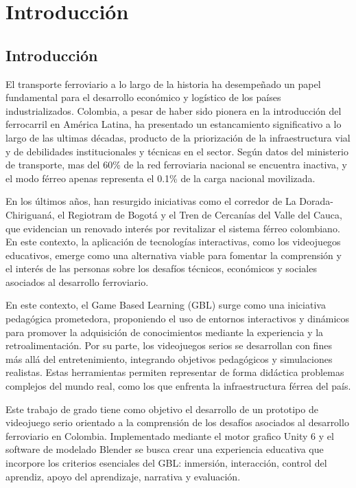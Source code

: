 
\chapter{Introducción}

\section{Introducción}
El transporte ferroviario a lo largo de la historia ha desempeñado un papel fundamental para el desarrollo económico y logístico de los países industrializados. Colombia, a pesar de haber sido pionera en la introducción del ferrocarril en América Latina, ha presentado un estancamiento significativo a lo largo de las ultimas décadas, producto de la priorización de la infraestructura vial y de debilidades institucionales y técnicas en el sector. Según datos del ministerio de transporte, mas del 60\% de la red ferroviaria nacional se encuentra inactiva, y el modo férreo apenas representa el 0.1\% de la carga nacional movilizada.

En los últimos años, han resurgido iniciativas como el corredor de La Dorada-Chiriguaná, el Regiotram de Bogotá y el Tren de Cercanías del Valle del Cauca, que evidencian un renovado interés por revitalizar el sistema férreo colombiano. En este contexto, la aplicación de tecnologías interactivas, como los videojuegos educativos, emerge como una alternativa viable para fomentar la comprensión y el interés de las personas sobre los desafíos técnicos, económicos y sociales asociados al desarrollo ferroviario.

En este contexto, el Game Based Learning (GBL) surge como una iniciativa pedagógica prometedora, proponiendo el uso de entornos interactivos y dinámicos para promover la adquisición de conocimientos mediante la experiencia y la retroalimentación. Por su parte, los videojuegos serios se desarrollan con fines más allá del entretenimiento, integrando objetivos pedagógicos y simulaciones realistas. Estas herramientas permiten representar de forma didáctica problemas complejos del mundo real, como los que enfrenta la infraestructura férrea del país.

Este trabajo de grado tiene como objetivo el desarrollo de un prototipo de videojuego serio orientado a la comprensión de los desafíos asociados al desarrollo ferroviario en Colombia. Implementado mediante el motor grafico Unity 6 y el software de modelado Blender se busca crear una experiencia educativa que incorpore los criterios esenciales del GBL: inmersión, interacción, control del aprendiz, apoyo del aprendizaje, narrativa y evaluación.


